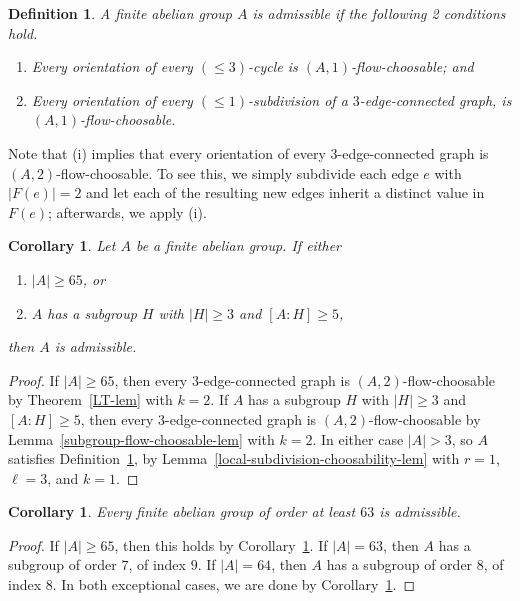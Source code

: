 \documentclass[a4paper,12pt]{article}
\theoremstyle{plain}
\newtheorem{cor}[theorem]{Corollary}
\newtheorem{definition}[theorem]{Definition}
\theoremstyle{definition}
\renewcommand\le\leqslant
\renewcommand\ge\geqslant
\begin{document}
\begin{definition}
    \label{admissible-group-def}
    A finite abelian group $A$ is \emph{admissible} if the following 2 conditions hold.
    \begin{enumerate}[label=\textup{(\roman*)}]
        \item Every orientation of every $(\le 3)$-cycle is $(A,1)$-flow-choosable; and
        \item Every orientation of every $(\le 1)$-subdivision of a $3$-edge-connected graph, is $(A,1)$-flow-choosable.
    \end{enumerate}
\end{definition}
Note that (i) implies that every orientation of every 3-edge-connected graph is $(A,2)$-flow-choosable.
To see this, we simply subdivide each edge $e$ with $|F(e)|=2$ and let each of the resulting new edges inherit a distinct value in $F(e)$; afterwards, we apply (i).

\begin{cor}
    \label{admissible-cor}
    Let $A$ be a finite abelian group.  If either
    \begin{enumerate}[label=\textup{(\roman*)}]
        \item $|A|\ge 65$, or
        \item $A$ has a subgroup $H$ with $|H|\ge 3$ and $[A:H]\ge 5$,
    \end{enumerate}
    then $A$ is admissible.
\end{cor}
\begin{proof}
    If $|A|\ge 65$, then every $3$-edge-connected graph is $(A,2)$-flow-choosable by Theorem~\ref{LT-lem} with $k=2$.  If $A$ has a subgroup $H$ with $|H|\ge 3$ and $[A:H]\ge 5$, then every $3$-edge-connected graph is $(A,2)$-flow-choosable by Lemma~\ref{subgroup-flow-choosable-lem} with $k=2$.  In either case $|A|>3$, so $A$ satisfies Definition~\ref{admissible-group-def}, by Lemma~\ref{local-subdivision-choosability-lem} with $r=1$, $\ell=3$, and $k=1$.
\end{proof}

\begin{cor}
    \label{large-group-admissible-cor}
    Every finite abelian group of order at least $63$ is admissible.
\end{cor}
\begin{proof}
    If $|A|\ge 65$, then this holds by  Corollary~\ref{admissible-cor}.  If $|A|=63$, then $A$ has a subgroup of order $7$, of index $9$.  If $|A|=64$, then $A$ has a subgroup of order $8$, of index $8$.  In both exceptional cases, we are done by Corollary~\ref{admissible-cor}.
\end{proof}
\end{document}
